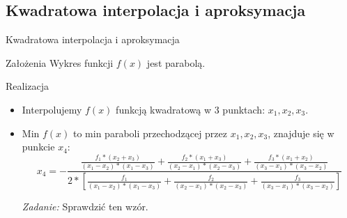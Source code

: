 \subsection{Kwadratowa interpolacja i aproksymacja}
  \begin{frame}{Kwadratowa interpolacja i aproksymacja}
    \begin{block}{Założenia}
      Wykres funkcji $f(x)$ jest parabolą.
    \end{block}
    \begin{block}{Realizacja}
      \begin{itemize}
        \item Interpolujemy $f(x)$ funkcją kwadratową w 3 punktach: $x_{1}{, }x_{2}{, }x_{3}$.
        \item Min $f(x) $ to min paraboli przechodzącej przez
        $x_{1}{, }x_{2}{, }x_{3}$, znajduje się w punkcie $x_4$:
        \begin{displaymath}
          x_4 = - \frac{
            \frac{f_{1}*(x_{2}+x_{3})}{(x_{1}-x_{2})*(x_{1}-x_{3})} +
            \frac{f_{2}*(x_{1}+x_{3})}{(x_{2}-x_{1})*(x_{2}-x_{3})} +
            \frac{f_{3}*(x_{1}+x_{2})}{(x_{3}-x_{1})*(x_{3}-x_{2})}
          }{2 * \left[
            \frac{f_{1}}{(x_{1}-x_{2})*(x_{1}-x_{3})} +
            \frac{f_{2}}{(x_{2}-x_{1})*(x_{2}-x_{3})} +
            \frac{f_{3}}{(x_{3}-x_{1})*(x_{3}-x_{2})}
          \right]}
        \end{displaymath}
        \begin{flushright}
          \emph{Zadanie:} Sprawdzić ten wzór.
        \end{flushright}
      \end{itemize}
    \end{block}
  \end{frame}


